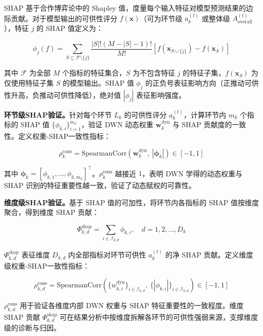 SHAP 基于合作博弈论中的 Shapley 值，度量每个输入特征对模型预测结果的边际贡献。对于模型输出的可供性评分 $f(\mathbf{x})$（可为环节级 $a_k^{(t)}$ 或整体级 $A_{\text{overall}}^{(t)}$），特征 $j$ 的 SHAP 值定义为：

\begin{equation}
\phi_j(f) = \sum_{S\subseteq\mathcal{F}\setminus\{j\}} \frac{|S|!(M-|S|-1)!}{M!}\left[f(\mathbf{x}_{S\cup\{j\}}) - f(\mathbf{x}_S)\right]
\end{equation}

其中 $\mathcal{F}$ 为全部 $M$ 个指标的特征集合，$S$ 为不包含特征 $j$ 的特征子集，$f(\mathbf{x}_S)$ 为仅使用特征子集 $S$ 的模型输出。SHAP 值 $\phi_j$ 的正负号表征影响方向（正推动可供性升高，负推动可供性降低），绝对值 $|\phi_j|$ 表征影响强度。

\textbf{环节级SHAP验证。}针对每个环节 $L_k$ 的可供性评分 $a_k^{(t)}$，计算环节内 $m_k$ 个指标的 SHAP 值 $\{\phi_{k,i}\}_{i=1}^{m_k}$，验证 DWN 动态权重 $\mathbf{w}_k^{\text{dyn}}$ 与 SHAP 贡献度的一致性。定义权重-SHAP一致性指标：

\begin{equation}
\rho_k^{\text{cons}} = \text{SpearmanCorr}\left(\mathbf{w}_k^{\text{dyn}},\ |\boldsymbol{\phi}_k|\right) \in [-1,1]
\end{equation}

其中 $\boldsymbol{\phi}_k = [\phi_{k,1},\ldots,\phi_{k,m_k}]^{\top}$。$\rho_k^{\text{cons}}$ 越接近 $1$，表明 DWN 学得的动态权重与 SHAP 识别的特征重要性越一致，验证了动态赋权的可靠性。

\textbf{维度级SHAP验证。}基于 SHAP 值的可加性，将环节内各指标的 SHAP 值按维度聚合，得到维度 SHAP 贡献：

\begin{equation}
\Phi_{k,d}^{\text{shap}} = \sum_{i\in\mathcal{I}_{k,d}} \phi_{k,i}, \quad d=1,2,\ldots,D_k
\end{equation}

$\Phi_{k,d}^{\text{shap}}$ 表征维度 $D_{k,d}$ 内全部指标对环节可供性 $a_k^{(t)}$ 的净 SHAP 贡献。定义维度级权重-SHAP一致性指标：

\begin{equation}
\rho_{k,d}^{\text{cons}} = \text{SpearmanCorr}\left(\{w_{k,i}^{\text{dyn}}\}_{i\in\mathcal{I}_{k,d}},\ \{|\phi_{k,i}|\}_{i\in\mathcal{I}_{k,d}}\right) \in [-1,1]
\end{equation}

$\rho_{k,d}^{\text{cons}}$ 用于验证各维度内部 DWN 权重与 SHAP 特征重要性的一致程度。维度 SHAP 贡献 $\Phi_{k,d}^{\text{shap}}$ 可在结果分析中按维度拆解各环节的可供性强弱来源，支撑维度级的诊断与归因。

